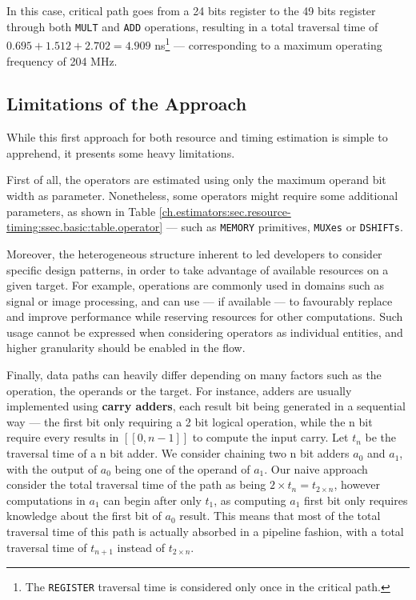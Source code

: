         In this case, critical path goes from a 24 bits register to the 49 bits register through both {\tt MULT} and {\tt ADD} operations, resulting in a total traversal time of $0.695 + 1.512 + 2.702 = 4.909$ ns\footnote{The {\tt REGISTER} traversal time is considered only once in the critical path.} --- corresponding to a maximum operating frequency of 204 MHz.


    \subsection{Limitations of the Approach}
    \label{ch.estimators:sec.resouce-timing:ssec.limitations}

        While this first approach for both resource and timing estimation is simple to apprehend, it presents some heavy limitations.

        First of all, the operators are estimated using only the maximum operand bit width as parameter.
        Nonetheless, some operators might require some additional parameters, as shown in Table \ref{ch.estimators:sec.resource-timing:ssec.basic:table.operator} --- such as {\tt MEMORY} primitives, {\tt MUXes} or {\tt DSHIFTs}.

        Moreover, the heterogeneous structure inherent to  led developers to consider specific design patterns, in order to take advantage of available resources on a given target.
        For example,  operations are commonly used in domains such as signal or image processing, and can use  --- if available --- to favourably replace  and improve performance while reserving resources for other computations.
        Such usage cannot be expressed when considering operators as individual entities, and higher granularity should be enabled in the flow.

        Finally, data paths can heavily differ depending on many factors such as the operation, the operands or the target.
        For instance, adders are usually implemented using {\bf carry adders}, each result bit being generated in a sequential way --- the first bit only requiring a 2 bit logical operation, while the n bit require every results in $[\![0, n-1]\!]$ to compute the input carry.
        Let $t_n$ be the traversal time of a n bit adder.
        We consider chaining two n bit adders $a_0$ and $a_1$, with the output of $a_0$ being one of the operand of $a_1$.
        Our naive approach consider the total traversal time of the path as being $2 \times t_n = t_{2\times n}$, however computations in $a_1$ can begin after only $t_1$, as computing $a_1$ first bit only requires knowledge about the first bit of $a_0$ result.
        This means that most of the total traversal time of this path is actually absorbed in a pipeline fashion, with a total traversal time of $t_{n+1}$ instead of $t_{2\times n}$.


